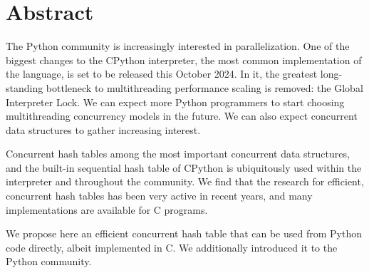 \chapter*{Abstract}
\label{ch:abstract}


The Python community is increasingly interested in parallelization.
One of the biggest changes to the CPython interpreter, the most common implementation of the language, is set to be released this October 2024.
In it, the greatest long-standing bottleneck to multithreading performance scaling is removed: the Global Interpreter Lock.
We can expect more Python programmers to start choosing multithreading concurrency models in the future.
We can also expect concurrent data structures to gather increasing interest.

Concurrent hash tables among the most important concurrent data structures, and the built-in sequential hash table of CPython is ubiquitously used within the interpreter and throughout the community.
We find that the research for efficient, concurrent hash tables has been very active in recent years, and many implementations are available for C programs.

We propose here an efficient concurrent hash table that can be used from Python code directly, albeit implemented in C.
We additionally introduced it to the Python community.
